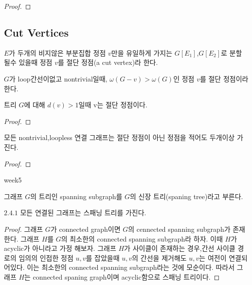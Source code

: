 \begin{proof}
    
\end{proof}

\subsection{Cut Vertices}

\begin{dfn}
    $E$가 두개의 비지않은 부분집합 정점 $v$만을 유일하게 가지는 $G[E_1]$,$G[E_2]$로 분할 될수 있을때 정점 $v$를 절단 정점(a cut vertex)라 한다.
    
    $G$가 loop간선이없고 nontrivial일때, $\omega(G-v) > \omega(G)$인 정점 $v$를 절단 정점이라 한다.
\end{dfn}

\begin{theorem}
    트리 $G$에 대해 $d(v) > 1$일때 v는 절단 정점이다.   
\end{theorem}

\begin{proof}
    
\end{proof}

\begin{corollary}
    모든 nontrivial,loopless 연결 그래프는 절단 정점이 아닌 정점을 적어도 두개이상 가진다.
\end{corollary}


\begin{proof}
    
\end{proof}

week5

\begin{dfn}
    그래프 $G$의 트리인 spanning subgraph를 $G$의 신장 트리(spaning tree)라고 부른다.
\end{dfn}

\begin{corollary}
    $2.4.1$ 모든 연결된 그래프는 스패닝 트리를 가진다.
\end{corollary}

\begin{proof}
    그래프 $G$가 connected graph이면 $G$의 cennected spanning subgraph가 존재한다.
    그래프 $H$를 $G$의 최소한의 connected spanning subgraph라 하자.
    이때 $H$가 acyclic가 아니라고 가정 해보자.
    그래프 $H$가 사이클이 존재하는 경우,간선 사이클 경로의 임의의 인접한 정점 $u, v$를 잡았을때 $u, v$의 간선을 제거해도 $u, v$는 여전이 연결되어있다. 이는 최소한의 connected spanning subgraph라는 것에 모순이다. 
    따라서 그래프 $H$는 connected spaning graph이며 acyclic함으로 스패닝 트리이다.
\end{proof}

